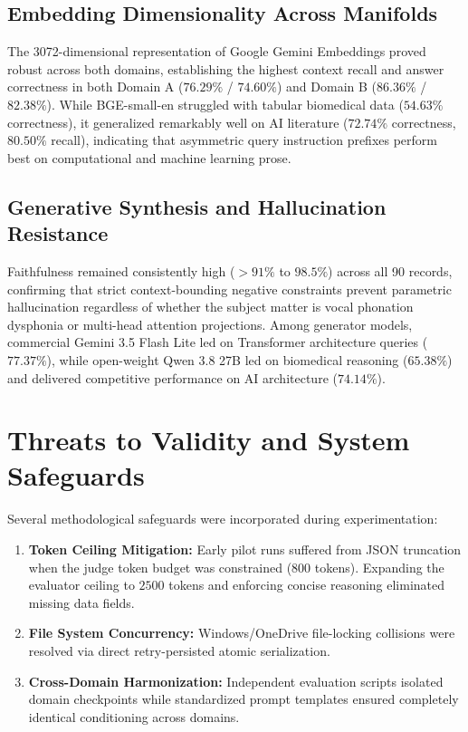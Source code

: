 \documentclass[conference]{IEEEtran}
\begin{document}
\subsection{Embedding Dimensionality Across Manifolds}
The 3072-dimensional representation of Google Gemini Embeddings proved robust across both domains, establishing the highest context recall and answer correctness in both Domain A ($76.29\%$ / $74.60\%$) and Domain B ($86.36\%$ / $82.38\%$). While BGE-small-en struggled with tabular biomedical data ($54.63\%$ correctness), it generalized remarkably well on AI literature ($72.74\%$ correctness, $80.50\%$ recall), indicating that asymmetric query instruction prefixes perform best on computational and machine learning prose.

\subsection{Generative Synthesis and Hallucination Resistance}
Faithfulness remained consistently high ($>91\%$ to $98.5\%$) across all 90 records, confirming that strict context-bounding negative constraints prevent parametric hallucination regardless of whether the subject matter is vocal phonation dysphonia or multi-head attention projections. Among generator models, commercial Gemini 3.5 Flash Lite led on Transformer architecture queries ($77.37\%$), while open-weight Qwen 3.8 27B led on biomedical reasoning ($65.38\%$) and delivered competitive performance on AI architecture ($74.14\%$).

\section{Threats to Validity and System Safeguards}
Several methodological safeguards were incorporated during experimentation:
\begin{enumerate}
    \item \textbf{Token Ceiling Mitigation:} Early pilot runs suffered from JSON truncation when the judge token budget was constrained ($800$ tokens). Expanding the evaluator ceiling to $2500$ tokens and enforcing concise reasoning eliminated missing data fields.
    \item \textbf{File System Concurrency:} Windows/OneDrive file-locking collisions were resolved via direct retry-persisted atomic serialization.
    \item \textbf{Cross-Domain Harmonization:} Independent evaluation scripts isolated domain checkpoints while standardized prompt templates ensured completely identical conditioning across domains.
\end{enumerate}
\end{document}
